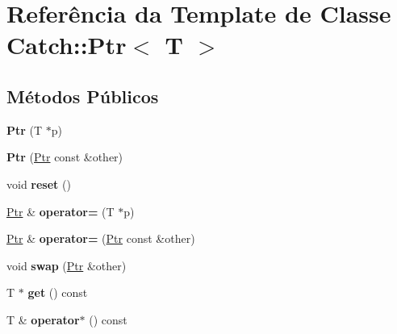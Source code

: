\hypertarget{classCatch_1_1Ptr}{}\section{Referência da Template de Classe Catch\+:\+:Ptr$<$ T $>$}
\label{classCatch_1_1Ptr}
\subsection*{Métodos Públicos}
\begin{DoxyCompactItemize}
\item 
{\bfseries Ptr} (T $\ast$p)\hypertarget{classCatch_1_1Ptr_aacec063a79cd142e39040a31c6b3c40b}{}\label{classCatch_1_1Ptr_aacec063a79cd142e39040a31c6b3c40b}

\item 
{\bfseries Ptr} (\hyperlink{classCatch_1_1Ptr}{Ptr} const \&other)\hypertarget{classCatch_1_1Ptr_ac629dd8ebe5763a37bb89e6c1d6a1771}{}\label{classCatch_1_1Ptr_ac629dd8ebe5763a37bb89e6c1d6a1771}

\item 
void {\bfseries reset} ()\hypertarget{classCatch_1_1Ptr_af8d0fa7a2cd20842830b354ac31dfe5c}{}\label{classCatch_1_1Ptr_af8d0fa7a2cd20842830b354ac31dfe5c}

\item 
\hyperlink{classCatch_1_1Ptr}{Ptr} \& {\bfseries operator=} (T $\ast$p)\hypertarget{classCatch_1_1Ptr_a9b08c868b447d679ed201921f5c94683}{}\label{classCatch_1_1Ptr_a9b08c868b447d679ed201921f5c94683}

\item 
\hyperlink{classCatch_1_1Ptr}{Ptr} \& {\bfseries operator=} (\hyperlink{classCatch_1_1Ptr}{Ptr} const \&other)\hypertarget{classCatch_1_1Ptr_af42074444c1bc6a70ebdc406a8617708}{}\label{classCatch_1_1Ptr_af42074444c1bc6a70ebdc406a8617708}

\item 
void {\bfseries swap} (\hyperlink{classCatch_1_1Ptr}{Ptr} \&other)\hypertarget{classCatch_1_1Ptr_a172bf8b4e71e26a5a4d92f5b02158b50}{}\label{classCatch_1_1Ptr_a172bf8b4e71e26a5a4d92f5b02158b50}

\item 
T $\ast$ {\bfseries get} () const \hypertarget{classCatch_1_1Ptr_a1617aa5ff058b53ea572cf965617b7ae}{}\label{classCatch_1_1Ptr_a1617aa5ff058b53ea572cf965617b7ae}

\item 
T \& {\bfseries operator$\ast$} () const \hypertarget{classCatch_1_1Ptr_a3a4c139032a8bd1bffa553103d5dbfd3}{}\label{classCatch_1_1Ptr_a3a4c139032a8bd1bffa553103d5dbfd3}


\end{DoxyCompactItemize}
